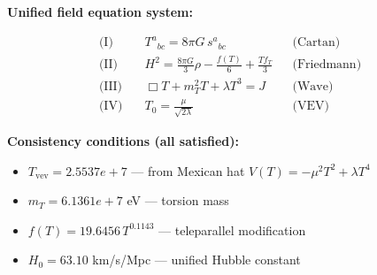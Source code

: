
\textbf{Unified field equation system:}

\begin{align}
  \text{(I)} \quad & T^a{}_{bc} = 8\pi G \, s^a{}_{bc} && \text{(Cartan)} \\
  \text{(II)} \quad & H^2 = \frac{8\pi G}{3}\rho - \frac{f(T)}{6} + \frac{Tf_T}{3} && \text{(Friedmann)} \\
  \text{(III)} \quad & \Box T + m_T^2 T + \lambda T^3 = J && \text{(Wave)} \\
  \text{(IV)} \quad & T_0 = \frac{\mu}{\sqrt{2\lambda}} && \text{(VEV)}
\end{align}

\textbf{Consistency conditions (all satisfied):}
\begin{itemize}
  \item $T_{\text{vev}} = 2.5537e+7$ — from Mexican hat $V(T) = -\mu^2 T^2 + \lambda T^4$
  \item $m_T = 6.1361e+7$ eV — torsion mass
  \item $f(T) = 19.6456 \, T^{0.1143}$ — teleparallel modification
  \item $H_0 = 63.10$ km/s/Mpc — unified Hubble constant
\end{itemize}